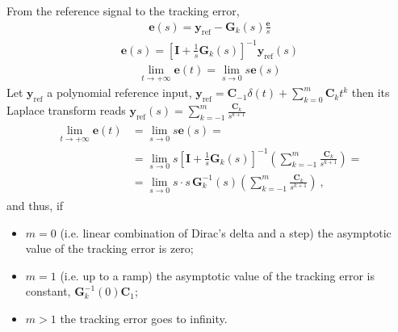 \documentclass[letterpaper,10pt,english]{jupyterBook}
\begin{document}
\sphinxAtStartPar
{} From the reference signal to the tracking error,
\begin{equation*}
\begin{split}\mathbf{e}(s) = \mathbf{y}_{\text{ref}} - \mathbf{G}_k(s) \frac{\mathbf{e}}{s}\end{split}
\end{equation*}\begin{equation*}
\begin{split}\mathbf{e}(s) = \left[ \mathbf{I} + \frac{1}{s} \mathbf{G}_k(s) \right]^{-1} \mathbf{y}_{\text{ref}}(s)\end{split}
\end{equation*}
\sphinxAtStartPar
{}
\begin{equation*}
\begin{split}\lim_{t \rightarrow +\infty} \mathbf{e}(t) = \lim_{s \rightarrow 0} s \mathbf{e}(s)\end{split}
\end{equation*}
\sphinxAtStartPar
Let \(\mathbf{y}_{\text{ref}}\) a polynomial reference input, \(\mathbf{y}_{\text{ref}} = \mathbf{C}_{-1} \delta(t) + \sum_{k=0}^{m} \mathbf{C}_k t^k\) then its Laplace transform reads \(\mathbf{y}_{\text{ref}}(s) = \sum_{k=-1}^{m} \frac{\mathbf{C}_k}{s^{k+1}}\)
\begin{equation*}
\begin{split}\begin{aligned}
  \lim_{t \rightarrow +\infty} \mathbf{e}(t) 
  & = \lim_{s \rightarrow 0} s \mathbf{e}(s) = \\
  & = \lim_{s \rightarrow 0} s \left[ \mathbf{I} + \frac{1}{s} \mathbf{G}_k(s) \right]^{-1} \left( \sum_{k=-1}^{m} \frac{\mathbf{C}_k}{s^{k+1}} \right) = \\
  & = \lim_{s \rightarrow 0} s \cdot s \, \mathbf{G}_k^{-1}(s) \left( \sum_{k=-1}^{m} \frac{\mathbf{C}_k}{s^{k+1}} \right) \ ,
\end{aligned}\end{split}
\end{equation*}
\sphinxAtStartPar
and thus, if
\begin{itemize}
\item {} 
\sphinxAtStartPar
\(m = 0\) (i.e. linear combination of Dirac’s delta and a step) the asymptotic value of the tracking error is zero;

\item {} 
\sphinxAtStartPar
\(m = 1\) (i.e. up to a ramp) the asymptotic value of the tracking error is constant, \(\mathbf{G}_k^{-1}(0) \mathbf{C}_1\);

\item {} 
\sphinxAtStartPar
\(m > 1\) the tracking error goes to infinity.

\end{itemize}
\end{document}
